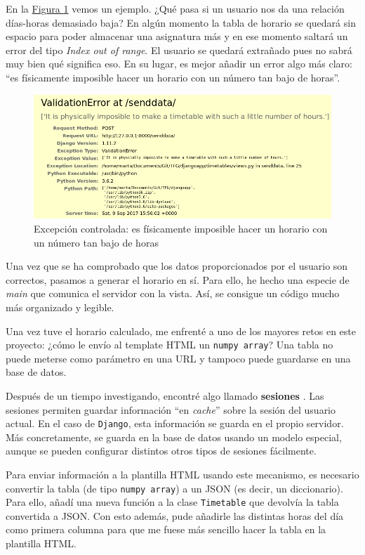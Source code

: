 En la \hyperref[exception]{Figura \ref*{exception}} vemos un ejemplo. ¿Qué pasa si un usuario nos da una relación días-horas demasiado baja? En algún momento la tabla de horario se quedará sin espacio para poder almacenar una asignatura más y en ese momento saltará un error del tipo \textit{Index out of range}. El usuario se quedará extrañado pues no sabrá muy bien qué significa eso. En su lugar, es mejor añadir un error algo más claro: ``es físicamente imposible hacer un horario con un número tan bajo de horas''. 

\begin{figure}
\centering
\includegraphics[width=\textwidth]{img/ValidationError}
\caption{Excepción controlada: es físicamente imposible hacer un horario con un número tan bajo de horas}
\label{exception}
\end{figure}

Una vez que se ha comprobado que los datos proporcionados por el usuario son correctos, pasamos a generar el horario en sí. Para ello, he hecho una especie de \textit{main} que comunica el servidor con la vista. Así, se consigue un código mucho más organizado y legible.

Una vez tuve el horario calculado, me enfrenté a uno de los mayores retos en este proyecto: ¿cómo le envío al template HTML un \texttt{numpy array}? Una tabla no puede meterse como parámetro en una URL y tampoco puede guardarse en una base de datos. 

Después de un tiempo investigando, encontré algo llamado \textbf{sesiones} \cite{sessions}. Las sesiones permiten guardar información ``en \textit{cache}'' sobre la sesión del usuario actual. En el caso de \texttt{Django}, esta información se guarda en el propio servidor. Más concretamente, se guarda en la base de datos usando un modelo especial, aunque se pueden configurar distintos otros tipos de sesiones fácilmente.

Para enviar información a la plantilla HTML usando este mecanismo, es necesario convertir la tabla (de tipo \texttt{numpy array}) a un JSON (es decir, un diccionario). Para ello, añadí una nueva función a la clase \texttt{Timetable} que devolvía la tabla convertida a JSON. Con esto además, pude añadirle las distintas horas del día como primera columna para que me fuese más sencillo hacer la tabla en la plantilla HTML.

